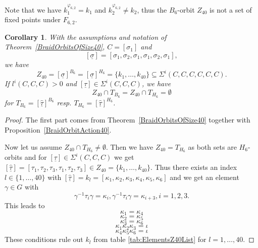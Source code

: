 \documentclass[12pt,a4paper]{article}
\newtheorem{corollary}{Corollary}[section]
\numberwithin{equation}{section}
\numberwithin{table}{section}
\begin{document}
%
\noindent
Note that we have $k_1^{\varphi_{6,2}} = k_1$ and $k_2^{\varphi_{6,2}} \neq k_2$, thus the $B_6$-orbit $Z_{40}$
is not a set of fixed points under $F_{6,2}$.
%
\begin{corollary}
\label{ExplicitZ40}
With the assumptions and notation of Theorem~\ref{BraidOrbitsOfSize40}, $C = [\sigma_1]$ and
$$[\underline{\sigma}] = [\sigma_1, \sigma_2, \sigma_1, \sigma_1, \sigma_2, \sigma_1],$$
we have
$$Z_{40} = [\underline{\sigma}]^{B_6} = [\underline{\sigma}]^{H_6} = \{ k_1, \dots, k_{40} \} \subseteq \Sigma^i(C,C,C,C,C,C).$$
If $l^i(C,C,C) > 0$ and $[\underline{\tau}] \in \Sigma^i(C,C,C)$, we have
$$Z_{40} \cap T_{B_6} =  Z_{40} \cap T_{H_6} = \emptyset$$
for $T_{B_6} = [\widehat{\underline{\tau}}]^{B_6}$ resp. $T_{H_6} = [\widehat{\underline{\tau}}]^{H_6}$.
\end{corollary}
\begin{proof}
The first part comes from Theorem~\ref{BraidOrbitsOfSize40} together with Proposition~\ref{BraidOrbitAction40}.
\par
\noindent
Now let us assume $Z_{40} \cap T_{H_6} \neq \emptyset$. Then we have $Z_{40} = T_{H_6}$ as both sets are $H_6$-orbits
and for $[\underline{\tau}] \in \Sigma^i(C,C,C)$ we get
$[\widehat{\underline{\tau}}] = [\tau_1, \tau_2, \tau_3, \tau_1, \tau_2, \tau_3] \in Z_{40} = \{ k_1, \dots, k_{40} \}$.
Thus there exists an index $l \in \{ 1, \dots, 40 \}$ with
$[\widehat{\underline{\tau}}] = k_l = [\kappa_1, \kappa_2, \kappa_3, \kappa_4, \kappa_5, \kappa_6]$
and we get an element $\gamma \in G$ with
$$\gamma^{-1} \tau_i \gamma = \kappa_i, \gamma^{-1} \tau_i \gamma = \kappa_{i+3}, i=1,2,3.$$ This leads to
\begin{equation} 
\label{eq:KappaCondition1}
\kappa_1 = \kappa_4
\end{equation}
\begin{equation} 
\label{eq:KappaCondition2}
\kappa_2 = \kappa_5
\end{equation}
\begin{equation} 
\label{eq:KappaCondition3}
\kappa_3 = \kappa_6
\end{equation}
\begin{equation}
\label{eq:KappaCondition4}
\kappa_1 \kappa_2 \kappa_3 = \iota
\end{equation}
\begin{equation}
\label{eq:KappaCondition5}
\kappa_4 \kappa_5 \kappa_6 = \iota
\end{equation}
These conditions rule out $k_l$ from table \ref{tab:ElementsZ40List} for $l = 1, \dots, 40$.

\end{proof}
\end{document}
